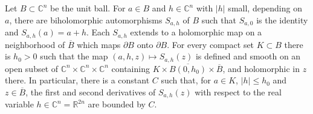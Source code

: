 \begin{lemma}\label{lem:ball-centered-automorphisms}
Let $B\subset\mathbb C^n$ be the unit ball. For $a\in B$ and $h\in\mathbb C^n$ with $|h|$ small, depending on $a$, there are biholomorphic automorphisms $S_{a,h}$ of $B$ such that $S_{a,0}$ is the identity and $S_{a,h}(a)=a+h$. Each $S_{a,h}$ extends to a holomorphic map on a neighborhood of $\overline B$ which maps $\partial B$ onto $\partial B$. For every compact set $K\subset B$ there is $h_0>0$ such that the map $(a,h,z)\mapsto S_{a,h}(z)$ is defined and smooth on an open subset of $\mathbb C^n\times\mathbb C^n\times\mathbb C^n$ containing $K\times\overline{B(0,h_0)}\times\overline B$, and holomorphic in $z$ there. In particular, there is a constant $C$ such that, for $a\in K$, $|h|\le h_0$ and $z\in\overline B$, the first and second derivatives of $S_{a,h}(z)$ with respect to the real variable $h\in\mathbb C^n=\mathbb R^{2n}$ are bounded by $C$.
\end{lemma}
